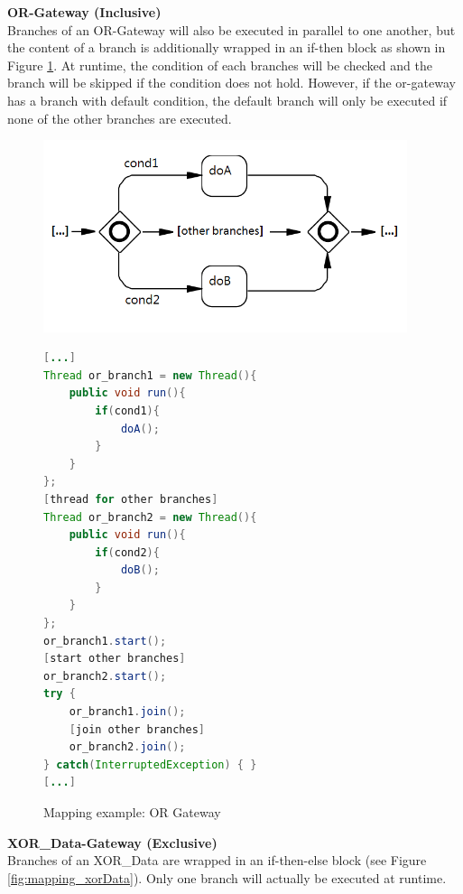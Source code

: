 \textbf{OR-Gateway (Inclusive)}\\
Branches of an OR-Gateway will also be executed in parallel to one another, but the content of a branch is additionally wrapped in an if-then block as shown in Figure \ref{fig:mapping_OR}. At runtime, the condition of each branches will be checked and the branch will be skipped if the condition does not hold. However, if the or-gateway has a branch with default condition, the default branch will only be executed if none of the other branches are executed.
\begin{figure}[h]
\begin{minipage}[c]{0.5\textwidth}
\includegraphics[width=0.95\textwidth]{images/mapping/or-gateway.png}
\end{minipage}
\begin{minipage}[c]{0.5\textwidth}
\begin{lstlisting}[language=Java]
[...]
Thread or_branch1 = new Thread(){
	public void run(){
		if(cond1){
			doA();
		}
	}
};
[thread for other branches]
Thread or_branch2 = new Thread(){
	public void run(){
		if(cond2){
			doB();
		}
	}
};
or_branch1.start();
[start other branches]
or_branch2.start();
try {
	or_branch1.join();
	[join other branches]
	or_branch2.join();
} catch(InterruptedException) { }
[...]
\end{lstlisting}
\end{minipage}
\caption{Mapping example: OR Gateway}%
\label{fig:mapping_OR}%
\end{figure}


\textbf{XOR\_Data-Gateway (Exclusive)}\\
Branches of an XOR\_Data are wrapped in an if-then-else block (see Figure \ref{fig:mapping_xorData}). Only one branch will actually be executed at runtime. \\

